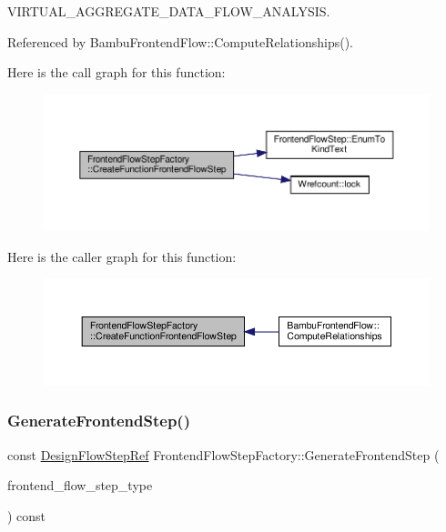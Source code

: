 V\+I\+R\+T\+U\+A\+L\+\_\+\+A\+G\+G\+R\+E\+G\+A\+T\+E\+\_\+\+D\+A\+T\+A\+\_\+\+F\+L\+O\+W\+\_\+\+A\+N\+A\+L\+Y\+S\+IS.



Referenced by Bambu\+Frontend\+Flow\+::\+Compute\+Relationships().

Here is the call graph for this function\+:
\nopagebreak
\begin{figure}[H]
\begin{center}
\leavevmode
\includegraphics[width=350pt]{db/dd6/classFrontendFlowStepFactory_a16fcc4098999af461632f4af3404e6fc_cgraph}
\end{center}
\end{figure}
Here is the caller graph for this function\+:
\nopagebreak
\begin{figure}[H]
\begin{center}
\leavevmode
\includegraphics[width=350pt]{db/dd6/classFrontendFlowStepFactory_a16fcc4098999af461632f4af3404e6fc_icgraph}
\end{center}
\end{figure}
\mbox{\label{classFrontendFlowStepFactory_ac7a8cb4ae2c919fb2d4d44eed8e1c0fa}} 
\subsubsection{\texorpdfstring{Generate\+Frontend\+Step()}{GenerateFrontendStep()}}
{\footnotesize\ttfamily const \hyperlink{design__flow__step_8hpp_a9dd6b4474ddf52d41a78b1aaa12ae6c8}{Design\+Flow\+Step\+Ref} Frontend\+Flow\+Step\+Factory\+::\+Generate\+Frontend\+Step (\begin{DoxyParamCaption}\item[{\hyperlink{frontend__flow__step_8hpp_afeb3716c693d2b2e4ed3e6d04c3b63bb}{Frontend\+Flow\+Step\+Type}}]{frontend\+\_\+flow\+\_\+step\+\_\+type }\end{DoxyParamCaption}) const}



